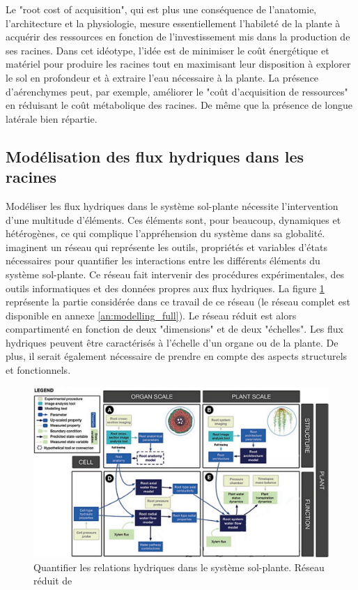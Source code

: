 Le "root cost of acquisition", qui est plus une conséquence de l'anatomie, l'architecture et la physiologie, mesure essentiellement l'habileté de la plante à acquérir des ressources en fonction de l'investissement mis dans la production de ses racines.
Dans cet idéotype, l'idée est de minimiser le coût énergétique et matériel pour produire les racines tout en maximisant leur disposition à explorer le sol en profondeur et à extraire l'eau nécessaire à la plante.
La présence d'aérenchymes peut, par exemple, améliorer le "coût d'acquisition de ressources" en réduisant le coût métabolique des racines.
De même que la présence de longue latérale bien répartie.
\newline

\subsection{Modélisation des flux hydriques dans les racines}

Modéliser les flux hydriques dans le système sol-plante nécessite l'intervention d'une multitude d'éléments.
Ces éléments sont, pour beaucoup, dynamiques et hétérogènes, ce qui complique l'appréhension du système dans sa globalité.
\cite{passot_connecting_2018} imaginent un réseau qui représente les outils, propriétés et variables d'états nécessaires pour quantifier les interactions entre les différents éléments du système sol-plante.
Ce réseau fait intervenir des procédures expérimentales, des outils informatiques et des données propres aux flux hydriques.
La figure \ref{fig:modelling} représente la partie considérée dans ce travail de ce réseau (le réseau complet est disponible en annexe \ref{an:modelling_full}).
Le réseau réduit est alors compartimenté en fonction de deux "dimensions" et de deux "échelles".
Les flux hydriques peuvent être caractérisés à l'échelle d'un organe ou de la plante.
De plus, il serait également nécessaire de prendre en compte des aspects structurels et fonctionnels.
\newpage

\begin{figure}[ht]
\centering
\includegraphics[width=1\textwidth]{Image/modelling_b.png}
\caption{Quantifier les relations hydriques dans le système sol-plante. Réseau réduit de \cite{passot_connecting_2018}}
\label{fig:modelling}
\end{figure}


